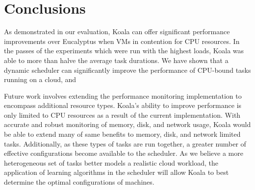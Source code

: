 \section{Conclusions}
\label{sec:conclusion}

As demonstrated in our evaluation, Koala can offer significant performance improvements over Eucalyptus when VMs in contention for CPU resources.  In the passes of the experiments which were run with the highest loads, Koala was able to more than halve the average task durations.    We have shown that a dynamic scheduler can significantly improve the performance of CPU-bound tasks running on a cloud, and 

Future work involves extending the performance monitoring implementation to encompass additional resource types.  Koala's ability to improve performance is only limited to CPU resources as a result of the current implementation.  With accurate and robust monitoring of memory, disk, and network usage, Koala would be able to extend many of same benefits to memory, disk, and network limited tasks.  Additionally, as these types of tasks are run together, a greater number of effective configurations become available to the scheduler.  As we believe a more heterogeneous set of tasks better models a realistic cloud workload, the application of learning algorithms in the scheduler will allow Koala to best determine the optimal configurations of machines.
